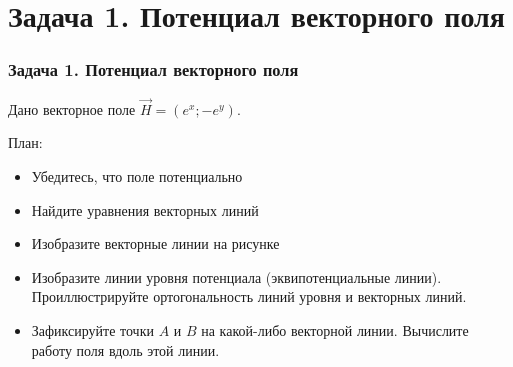 \section{Задача 1. Потенциал векторного поля}
\begin{frame}\frametitle{Задача 1. Потенциал векторного поля}
Дано векторное поле $\vec H = \left( e^x; -e^y \right)$.

План:
\begin{itemize}
  \item Убедитесь, что поле потенциально
  \item Найдите уравнения векторных линий
  \item Изобразите векторные линии на рисунке
  \item Изобразите линии уровня потенциала (эквипотенциальные линии).
  Проиллюстрируйте ортогональность линий уровня и векторных линий.
  \item Зафиксируйте точки $A$ и $B$ на какой-либо векторной линии.
  Вычислите работу поля вдоль этой линии.
\end{itemize}
\end{frame}


